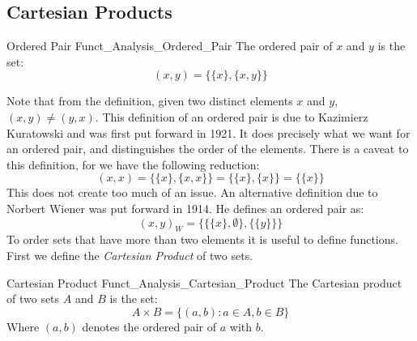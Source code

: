         \subsection{Cartesian Products}
            \begin{ldefinition}{Ordered Pair}
                  {Funct_Analysis_Ordered_Pair}
                The \gls{ordered pair} of $x$ and $y$ is the set:
                \begin{equation}
                    (x,y)=\big\{\{x\},\{x,y\}\big\}
                \end{equation}
            \end{ldefinition}
            Note that from the definition, given two distinct
            elements $x$ and $y$, $(x,y)\ne(y,x)$. This definition
            of an ordered pair is due to Kazimierz Kuratowski
            and was first put forward in 1921. It does precisely
            what we want for an ordered pair, and distinguishes
            the order of the elements. There is a caveat to this
            definition, for we have the following reduction:
            \begin{equation}
                (x,x)=\big\{\{x\},\{x,x\}\big\}
                =\big\{\{x\},\{x\}\big\}
                =\big\{\{x\}\big\}
            \end{equation}
            This does not create too much of an issue. An
            alternative definition due to Norbert Wiener was put
            forward in 1914. He defines an ordered pair as:
            \begin{equation}
                (x,y)_{W}=\Big\{\big\{\{x\},\emptyset\big\},
                    \big\{\{y\}\big\}\Big\}
            \end{equation}
            To order sets that have more than two elements it is
            useful to define functions. First we define the
            \textit{Cartesian Product} of two sets.
            \begin{ldefinition}{Cartesian Product}
                  {Funct_Analysis_Cartesian_Product}
                The \gls{Cartesian product} of two sets $A$
                and $B$ is the set:
                \begin{equation}
                    A\times{B}=\{(a,b):a\in{A},b\in{B}\}
                \end{equation}
                Where $(a,b)$ denotes the ordered pair of
                $a$ with $b$.
            \end{ldefinition}
